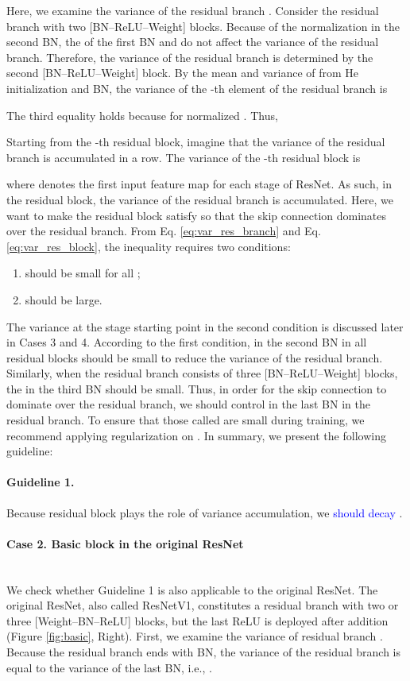 \documentclass{article}
\begin{document}
Here, we examine the variance of the residual branch . Consider the residual branch with two [BN--ReLU--Weight] blocks. Because of the normalization in the second BN, the  of the first BN and  do not affect the variance of the residual branch. Therefore, the variance of the residual branch is determined by the second [BN--ReLU--Weight] block. By the mean and variance of  from He initialization and BN, the variance of the -th element of the residual branch is

The third equality holds because  for normalized  \cite{giccv/HeZRS15}. Thus,


Starting from the -th residual block, imagine that the variance of the residual branch is accumulated in a row. The variance of the -th residual block is

where  denotes the first input feature map for each stage of ResNet. As such, in the residual block, the variance of the residual branch is accumulated. Here, we want to make the residual block satisfy  so that the skip connection dominates over the residual branch. From Eq. \ref{eq:var_res_branch} and Eq. \ref{eq:var_res_block}, the inequality  requires two conditions:
\begin{enumerate}
	\item  should be small for all ;
	\item  should be large.
\end{enumerate}
The variance at the stage starting point in the second condition is discussed later in Cases 3 and 4. According to the first condition,  in the second BN in all residual blocks should be small to reduce the variance of the residual branch. Similarly, when the residual branch consists of three [BN--ReLU--Weight] blocks, the  in the third BN should be small. Thus, in order for the skip connection to dominate over the residual branch, we should control  in the last BN in the residual branch. To ensure that those called  are small during training, we recommend applying  regularization on . In summary, we present the following guideline:
\paragraph{Guideline 1.}Because residual block plays the role of variance accumulation, we \textcolor{blue}{should decay} .

\paragraph{Case 2. Basic block in the original ResNet} \ \\
We check whether Guideline 1 is also applicable to the original ResNet. The original ResNet, also called ResNetV1, constitutes a residual branch with two or three [Weight--BN--ReLU] blocks, but the last ReLU is deployed after addition (Figure \ref{fig:basic}, Right). First, we examine the variance of residual branch . Because the residual branch ends with BN, the variance of the residual branch is equal to the variance of the last BN, i.e., .
\end{document}
